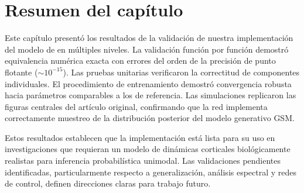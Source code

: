 \section{Resumen del capítulo}
\label{sec:res_summary}

Este capítulo presentó los resultados de la validación de nuestra implementación del modelo de \citet{echeveste2020cortical} en múltiples niveles. La validación función por función demostró equivalencia numérica exacta con errores del orden de la precisión de punto flotante ($\sim 10^{-15}$). Las pruebas unitarias verificaron la correctitud de componentes individuales. El procedimiento de entrenamiento demostró convergencia robusta hacia parámetros comparables a los de referencia. Las simulaciones replicaron las figuras centrales del artículo original, confirmando que la red implementa correctamente muestreo de la distribución posterior del modelo generativo \acrshort{GSM}.

Estos resultados establecen que la implementación está lista para su uso en investigaciones que requieran un modelo de dinámicas corticales biológicamente realistas para inferencia probabilística unimodal. Las validaciones pendientes identificadas, particularmente respecto a generalización, análisis espectral y redes de control, definen direcciones claras para trabajo futuro.